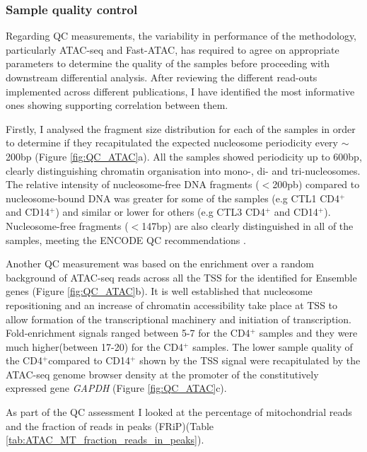 


\subsubsection{Sample quality control}
Regarding QC measurements, the variability in performance of the methodology, particularly ATAC-seq and Fast-ATAC, has required to agree on appropriate parameters to determine the quality of the samples before proceeding with downstream differential analysis. After reviewing the different read-outs implemented across different publications, I have identified the most informative ones showing supporting correlation between them.

Firstly, I analysed the fragment size distribution for each of the samples in order to determine if they recapitulated the expected nucleosome periodicity every $\sim$200bp (Figure \ref{fig:QC_ATAC}a). All the samples showed periodicity up to 600bp, clearly distinguishing chromatin organisation into mono-, di- and tri-nucleosomes. The relative intensity of nucleosome-free DNA fragments ($<$200pb) compared to nucleosome-bound DNA was greater for some of the samples (e.g CTL1 CD4$^+$ and CD14$^+$) and similar or lower for others (e.g CTL3 CD4$^+$ and CD14$^+$). Nucleosome-free fragments ($<$147bp) are also clearly distinguished in all of the samples, meeting the ENCODE QC recommendations \parencite{ENCODE}.

Another QC measurement was based on the enrichment over a random background of ATAC-seq reads across all the TSS for the identified for Ensemble genes (Figure \ref{fig:QC_ATAC}b). It is well established that nucleosome repositioning and an increase of chromatin accessibility take place at TSS to allow formation of the transcriptional machinery and initiation of transcription. Fold-enrichment signals ranged between 5-7 for the CD4$^+$ samples and they were much higher(between 17-20) for the CD4$^+$ samples. The lower sample quality of the CD4$^+$compared to CD14$^+$ shown by the TSS signal were recapitulated by the ATAC-seq genome browser density at the promoter of the constitutively expressed gene \textit{GAPDH} (Figure \ref{fig:QC_ATAC}c). 
	
As part of the QC assessment I looked at the percentage of mitochondrial reads and the fraction of reads in peaks (FRiP)(Table \ref{tab:ATAC_MT_fraction_reads_in_peaks}). 

